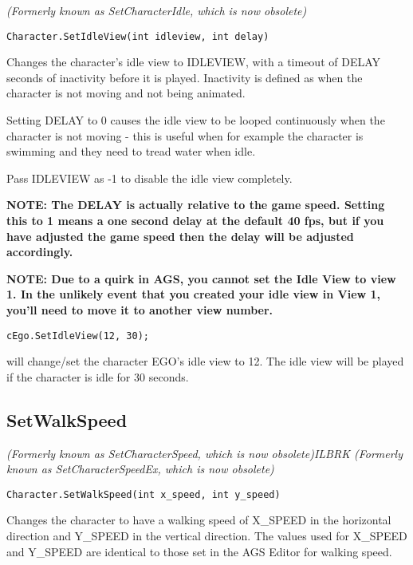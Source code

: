 \it{(Formerly known as SetCharacterIdle, which is now obsolete)}

\begin{verbatim}
Character.SetIdleView(int idleview, int delay)
\end{verbatim}
Changes the character's idle view to IDLEVIEW, with a timeout of DELAY seconds
of inactivity before it is played. Inactivity is defined as when the character
is not moving and not being animated.

Setting DELAY to 0 causes the idle view to be looped continuously when
the character is not moving - this is useful when for example the character
is swimming and they need to tread water when idle.

Pass IDLEVIEW as -1 to disable the idle view completely.

\bf{NOTE:} The DELAY is actually relative to the game speed. Setting this to 1 means
a one second delay at the default 40 fps, but if you have adjusted the game speed then
the delay will be adjusted accordingly.

\bf{NOTE:} Due to a quirk in AGS, you cannot set the Idle View to view 1. In the unlikely event that you
created your idle view in View 1, you'll need to move it to another view number.

\begin{verbatim}
cEgo.SetIdleView(12, 30);
\end{verbatim}
will change/set the character EGO's idle view to 12. The idle view will be
played if the character is idle for 30 seconds.


\subsection{SetWalkSpeed}\label{Character.SetWalkSpeed}%

\it{(Formerly known as SetCharacterSpeed, which is now obsolete)}ILBRK
\it{(Formerly known as SetCharacterSpeedEx, which is now obsolete)}

\begin{verbatim}
Character.SetWalkSpeed(int x_speed, int y_speed)
\end{verbatim}

Changes the character to have a walking speed of X_SPEED in the horizontal direction
and Y_SPEED in the vertical direction. The values used for X_SPEED and Y_SPEED are
identical to those set in the AGS Editor for walking speed.

